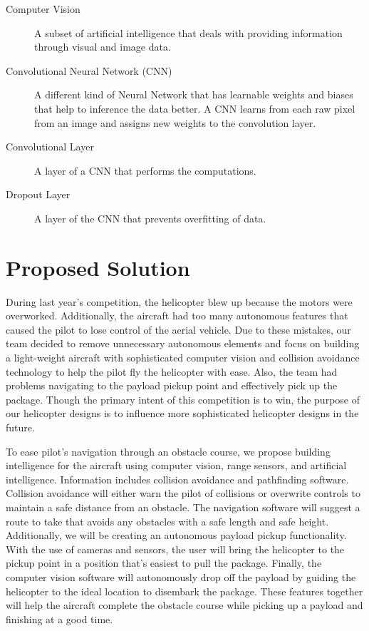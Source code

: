 \documentclass[onecolumn, oneside, letterpaper, draftclsnofoot, 10pt, compsoc]{IEEEtran}
\begin{document}
\begin{description}
\item[Computer Vision] A subset of artificial intelligence that deals with providing information through visual and image data.

\item[Convolutional Neural Network (CNN)] A different kind of Neural Network that has learnable weights and biases that help to inference the data better. A CNN learns from each raw pixel from an image and assigns new weights to the convolution layer.

\item[Convolutional Layer] A layer of a CNN that performs the computations.

\item[Dropout Layer] A layer of the CNN that prevents overfitting of data.
\end{description}


\section{Proposed Solution}
During last year's competition, the helicopter blew up because the motors were overworked. Additionally, the aircraft had too many autonomous features that caused the pilot to lose control of the aerial vehicle. Due to these mistakes, our team decided to remove unnecessary autonomous elements and focus on building a light-weight aircraft with sophisticated computer vision and collision avoidance technology to help the pilot fly the helicopter with ease. Also, the team had problems navigating to the payload pickup point and effectively pick up the package. Though the primary intent of this competition is to win, the purpose of our helicopter designs is to influence more sophisticated helicopter designs in the future.

To ease pilot’s navigation through an obstacle course, we propose building intelligence for the aircraft using computer vision, range sensors, and artificial intelligence. Information includes collision avoidance and pathfinding software. Collision avoidance will either warn the pilot of collisions or overwrite controls to maintain a safe distance from an obstacle. The navigation software will suggest a route to take that avoids any obstacles with a safe length and safe height. Additionally, we will be creating an autonomous payload pickup functionality. With the use of cameras and sensors, the user will bring the helicopter to the pickup point in a position that's easiest to pull the package. Finally, the computer vision software will autonomously drop off the payload by guiding the helicopter to the ideal location to disembark the package. These features together will help the aircraft complete the obstacle course while picking up a payload and finishing at a good time.
\end{document}
